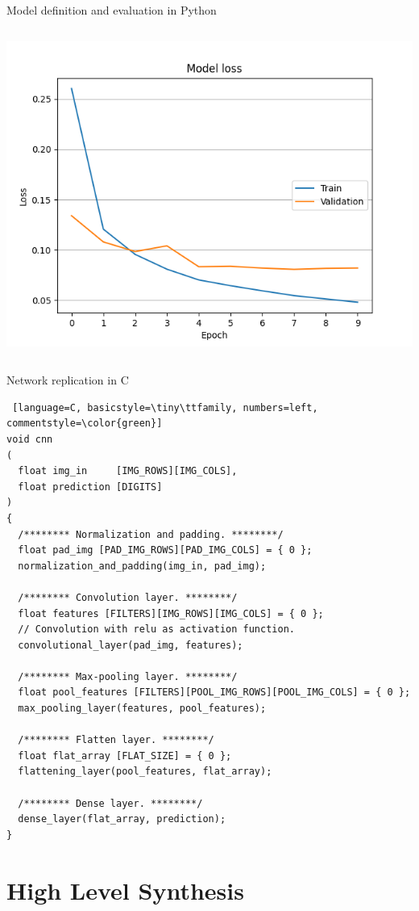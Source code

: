 \documentclass[xcolor=table]{beamer}
\begin{document}
\begin{frame}{Model definition and evaluation in Python}
\begin{columns}[T]
\begin{column}{0.5\columnwidth}
      \includegraphics[scale=0.3]{Images/loss.png}
    \end{column}
  \end{columns}
\end{frame}


\begin{frame}[fragile]{Network replication in C}
  \begin{lstlisting} [language=C, basicstyle=\tiny\ttfamily, numbers=left, commentstyle=\color{green}]
void cnn
(
  float img_in     [IMG_ROWS][IMG_COLS],
  float prediction [DIGITS]
)
{
  /******** Normalization and padding. ********/
  float pad_img [PAD_IMG_ROWS][PAD_IMG_COLS] = { 0 };
  normalization_and_padding(img_in, pad_img);

  /******** Convolution layer. ********/
  float features [FILTERS][IMG_ROWS][IMG_COLS] = { 0 };
  // Convolution with relu as activation function.
  convolutional_layer(pad_img, features);

  /******** Max-pooling layer. ********/
  float pool_features [FILTERS][POOL_IMG_ROWS][POOL_IMG_COLS] = { 0 };
  max_pooling_layer(features, pool_features);

  /******** Flatten layer. ********/
  float flat_array [FLAT_SIZE] = { 0 };
  flattening_layer(pool_features, flat_array);

  /******** Dense layer. ********/
  dense_layer(flat_array, prediction);
}
  \end{lstlisting}
\end{frame}

\section{High Level Synthesis}
\end{document}

